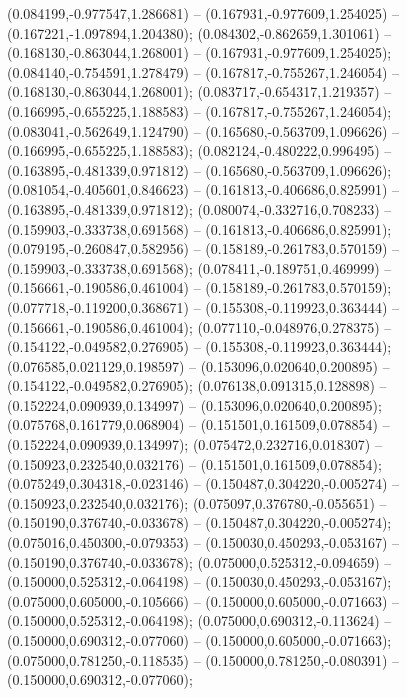  (0.084199,-0.977547,1.286681) -- (0.167931,-0.977609,1.254025) -- (0.167221,-1.097894,1.204380);
 (0.084302,-0.862659,1.301061) -- (0.168130,-0.863044,1.268001) -- (0.167931,-0.977609,1.254025);
 (0.084140,-0.754591,1.278479) -- (0.167817,-0.755267,1.246054) -- (0.168130,-0.863044,1.268001);
 (0.083717,-0.654317,1.219357) -- (0.166995,-0.655225,1.188583) -- (0.167817,-0.755267,1.246054);
 (0.083041,-0.562649,1.124790) -- (0.165680,-0.563709,1.096626) -- (0.166995,-0.655225,1.188583);
 (0.082124,-0.480222,0.996495) -- (0.163895,-0.481339,0.971812) -- (0.165680,-0.563709,1.096626);
 (0.081054,-0.405601,0.846623) -- (0.161813,-0.406686,0.825991) -- (0.163895,-0.481339,0.971812);
 (0.080074,-0.332716,0.708233) -- (0.159903,-0.333738,0.691568) -- (0.161813,-0.406686,0.825991);
 (0.079195,-0.260847,0.582956) -- (0.158189,-0.261783,0.570159) -- (0.159903,-0.333738,0.691568);
 (0.078411,-0.189751,0.469999) -- (0.156661,-0.190586,0.461004) -- (0.158189,-0.261783,0.570159);
 (0.077718,-0.119200,0.368671) -- (0.155308,-0.119923,0.363444) -- (0.156661,-0.190586,0.461004);
 (0.077110,-0.048976,0.278375) -- (0.154122,-0.049582,0.276905) -- (0.155308,-0.119923,0.363444);
 (0.076585,0.021129,0.198597) -- (0.153096,0.020640,0.200895) -- (0.154122,-0.049582,0.276905);
 (0.076138,0.091315,0.128898) -- (0.152224,0.090939,0.134997) -- (0.153096,0.020640,0.200895);
 (0.075768,0.161779,0.068904) -- (0.151501,0.161509,0.078854) -- (0.152224,0.090939,0.134997);
 (0.075472,0.232716,0.018307) -- (0.150923,0.232540,0.032176) -- (0.151501,0.161509,0.078854);
 (0.075249,0.304318,-0.023146) -- (0.150487,0.304220,-0.005274) -- (0.150923,0.232540,0.032176);
 (0.075097,0.376780,-0.055651) -- (0.150190,0.376740,-0.033678) -- (0.150487,0.304220,-0.005274);
 (0.075016,0.450300,-0.079353) -- (0.150030,0.450293,-0.053167) -- (0.150190,0.376740,-0.033678);
 (0.075000,0.525312,-0.094659) -- (0.150000,0.525312,-0.064198) -- (0.150030,0.450293,-0.053167);
 (0.075000,0.605000,-0.105666) -- (0.150000,0.605000,-0.071663) -- (0.150000,0.525312,-0.064198);
 (0.075000,0.690312,-0.113624) -- (0.150000,0.690312,-0.077060) -- (0.150000,0.605000,-0.071663);
 (0.075000,0.781250,-0.118535) -- (0.150000,0.781250,-0.080391) -- (0.150000,0.690312,-0.077060);
